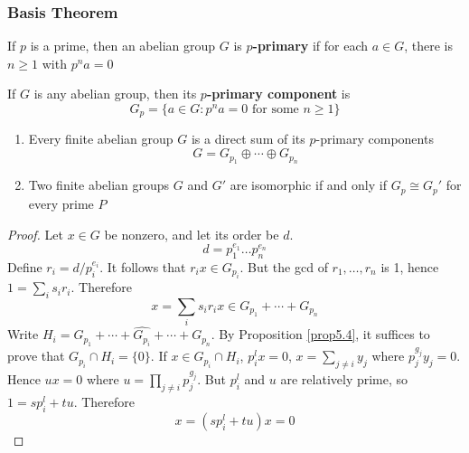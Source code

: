 \documentclass[11pt]{article}
\begin{document}
\subsubsection{Basis Theorem}
\label{sec:org23ca809}
\begin{definition}[]
If \(p\) is a prime, then an abelian group \(G\) is \textbf{\(p\)-primary} if for each
\(a\in G\), there is \(n\ge 1\) with \(p^na=0\)

If \(G\) is any abelian group, then its \textbf{\(p\)-primary component} is 
\begin{equation*}
G_p=\{a\in G:p^na=0\text{ for some }n\ge1\}
\end{equation*}
\end{definition}


\begin{theorem}
\begin{enumerate}
\item Every finite abelian group \(G\) is a direct sum of its \(p\)-primary
components
\begin{equation*}
G=G_{p_1}\oplus\cdots\oplus G_{p_n}
\end{equation*}
\item Two finite abelian groups \(G\) and \(G'\) are isomorphic if and only if
\(G_p\cong G_p'\) for every prime \(P\)
\end{enumerate}
\end{theorem}

\begin{proof}
Let \(x\in G\) be nonzero, and let its order be \(d\).
\begin{equation*}
d=p_1^{e_1}\dots p_n^{e_n}
\end{equation*}
Define \(r_i=d/p_i^{e_i}\). It follows that \(r_ix\in G_{p_i}\). But the gcd
of \(r_1,\dots,r_n\) is 1, hence \(1=\sum_is_ir_i\). Therefore
\begin{equation*}
x=\displaystyle\sum_{i}s_ir_ix\in G_{p_1}+\cdots+G_{p_n}
\end{equation*}
Write \(H_i=G_{p_1}+\cdots+\widehat{G_{p_i}}+\cdots+G_{p_n}\). By
Proposition \ref{prop5.4}, it suffices to prove that 
\(G_{p_i}\cap H_i=\{0\}\). If \(x\in G_{p_i}\cap H_i\), \(p_i^lx=0\), 
\(x=\sum_{j\neq i}y_j\) where \(p_j^{g_j}y_j=0\). Hence 
\(ux=0\) where \(u=\prod_{j\neq i}p_j^{g_j}\). But \(p_i^l\) and \(u\) are
relatively prime, so \(1=sp_i^l+tu\). Therefore
\begin{equation*}
x=(sp_i^l+tu)x=0
\end{equation*}
\end{proof}
\end{document}
